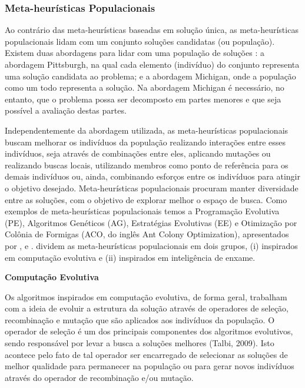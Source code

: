 \subsubsection{Meta-heurísticas Populacionais}
\label{subsec:subc2152}
Ao contrário das meta-heurísticas baseadas em solução única, as meta-heurísticas populacionais lidam com um conjunto soluções candidatas (ou população). Existem duas abordagens para lidar com uma população de soluções \cite{Freitas2003,Ishibuchi1997}: a abordagem Pittsburgh, na qual cada elemento (indivíduo) do conjunto representa uma solução candidata ao problema; e a abordagem Michigan, onde a população como um todo representa a solução. Na abordagem Michigan é necessário, no entanto, que o problema possa ser decomposto em partes menores e que seja possível a avaliação destas partes.

Independentemente da abordagem utilizada, as meta-heurísticas populacionais buscam melhorar os indivíduos da população realizando interações entre esses indivíduos, seja através de combinações entre eles, aplicando mutações ou realizando buscas locais, utilizando membros como ponto de referência para os demais indivíduos ou, ainda, combinando esforços entre os indivíduos para atingir o objetivo desejado. Meta-heurísticas populacionais procuram manter diversidade entre as soluções, com o objetivo de explorar melhor o espaço de busca. Como exemplos de meta-heurísticas populacionais temos a Programação Evolutiva (PE), Algoritmos Genéticos (AG), Estratégias Evolutivas (EE) e Otimização por Colônia de Formigas (ACO, do inglês Ant Colony Optimization), apresentados por ,  e . dividem as meta-heurísticas populacionais em dois grupos, (i) inspirados em computação evolutiva e (ii) inspirados em inteligência de enxame. 

\textbf{Computação Evolutiva}

Os algoritmos inspirados em computação evolutiva, de forma geral, trabalham com a ideia de evoluir a estrutura da solução através de operadores de seleção, recombinação e mutação que são aplicados aos indivíduos da população. O operador de seleção é um dos principais componentes dos algoritmos evolutivos, sendo responsável por levar a busca a soluções melhores (Talbi, 2009). Isto acontece pelo fato de tal operador ser encarregado de selecionar as soluções de melhor qualidade para permanecer na população ou para gerar novos indivíduos através do operador de recombinação e/ou mutação. 

